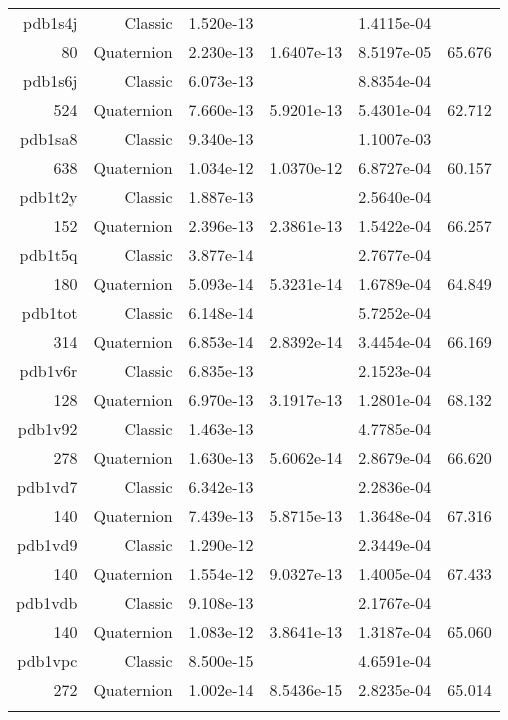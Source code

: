 \begin{xltabular}{\textwidth}{r|rS[table-format=1.3e+2]S[table-format=1.4e+2]S[table-format=1.4e+2]S[table-format=-1.3]}
pdb1s4j & Classic & 1.520e-13 &  & 1.4115e-04 & \\
80 & Quaternion & 2.230e-13 & 1.6407e-13 & 8.5197e-05 & 65.676\\  \addlinespace
pdb1s6j & Classic & 6.073e-13 &  & 8.8354e-04 & \\
524 & Quaternion & 7.660e-13 & 5.9201e-13 & 5.4301e-04 & 62.712\\  \addlinespace
pdb1sa8 & Classic & 9.340e-13 &  & 1.1007e-03 & \\
638 & Quaternion & 1.034e-12 & 1.0370e-12 & 6.8727e-04 & 60.157\\  \addlinespace
pdb1t2y & Classic & 1.887e-13 &  & 2.5640e-04 & \\
152 & Quaternion & 2.396e-13 & 2.3861e-13 & 1.5422e-04 & 66.257\\  \addlinespace
pdb1t5q & Classic & 3.877e-14 &  & 2.7677e-04 & \\
180 & Quaternion & 5.093e-14 & 5.3231e-14 & 1.6789e-04 & 64.849\\  \addlinespace
pdb1tot & Classic & 6.148e-14 &  & 5.7252e-04 & \\
314 & Quaternion & 6.853e-14 & 2.8392e-14 & 3.4454e-04 & 66.169\\  \addlinespace
pdb1v6r & Classic & 6.835e-13 &  & 2.1523e-04 & \\
128 & Quaternion & 6.970e-13 & 3.1917e-13 & 1.2801e-04 & 68.132\\  \addlinespace
pdb1v92 & Classic & 1.463e-13 &  & 4.7785e-04 & \\
278 & Quaternion & 1.630e-13 & 5.6062e-14 & 2.8679e-04 & 66.620\\  \addlinespace
pdb1vd7 & Classic & 6.342e-13 &  & 2.2836e-04 & \\
140 & Quaternion & 7.439e-13 & 5.8715e-13 & 1.3648e-04 & 67.316\\  \addlinespace
pdb1vd9 & Classic & 1.290e-12 &  & 2.3449e-04 & \\
140 & Quaternion & 1.554e-12 & 9.0327e-13 & 1.4005e-04 & 67.433\\  \addlinespace
pdb1vdb & Classic & 9.108e-13 &  & 2.1767e-04 & \\
140 & Quaternion & 1.083e-12 & 3.8641e-13 & 1.3187e-04 & 65.060\\  \addlinespace
pdb1vpc & Classic & 8.500e-15 &  & 4.6591e-04 & \\
272 & Quaternion & 1.002e-14 & 8.5436e-15 & 2.8235e-04 & 65.014\\  \addlinespace

\end{xltabular}
